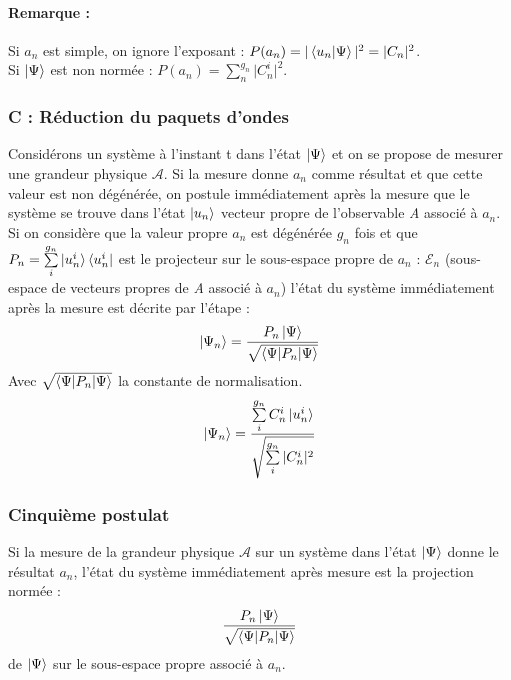 \documentclass[12pt,a4paper,titlepage]{book}
\begin{document}
\paragraph*{Remarque :}
Si $a_n$ est simple, on ignore l'exposant : $P(a_n) = \vert \braket{u_n | \Psi} \vert^2 = \vert C_n \vert^2$.\\

Si $\ket\Psi$ est non normée : $P(a_n) = \sum\limits_n^{g_n} \vert C_n^i \vert^2$.

\subsubsection{C : Réduction du paquets d'ondes}

Considérons un système à l'instant t dans l'état $\ket\Psi$ et on se propose de mesurer une grandeur physique $\mathcal{A}$. Si la mesure donne $a_n$ comme résultat et que cette valeur est non dégénérée, on postule immédiatement après la mesure que le système se trouve dans l'état $\ket{u_n}$ vecteur propre de l'observable \textit{A} associé à $a_n$.\\

Si on considère que la valeur propre $a_n$ est dégénérée $g_n$ fois et que $P_n = \sum\limits_i^{g_n} \ket{u_n^i} \bra{u_n^i}$ est le projecteur sur le sous-espace propre de $a_n$ : $\mathcal{E}_n$ (sous-espace de vecteurs propres de \textit{A} associé à $a_n$) l'état du système immédiatement après la mesure est décrite par l'étape :
\begin{equation*}
\ket{\Psi_n} = \frac{P_n \ket\Psi}{\sqrt{\braket{\Psi | P_n | \Psi}}}
\end{equation*}
Avec $\sqrt{\braket{\Psi | P_n | \Psi}}$ la constante de normalisation.
\begin{equation*}
\Ket{\Psi_n} = \frac{\sum\limits_i^{g_n} C_n^i \ket{u_n^i}}{\sqrt{\sum\limits_i^{g_n} \vert C_n^i \vert^2}}
\end{equation*}

\subsubsection{Cinquième postulat}
Si la mesure de la grandeur physique $\mathcal{A}$ sur un système dans l'état $\ket\Psi$ donne le résultat $a_n$, l'état du système immédiatement après mesure est la projection normée :
\begin{equation*}
\frac{P_n \ket\Psi}{\sqrt{\braket{\Psi | P_n | \Psi}}}
\end{equation*}
de $\ket\Psi$ sur le sous-espace propre associé à $a_n$.\\
\end{document}
